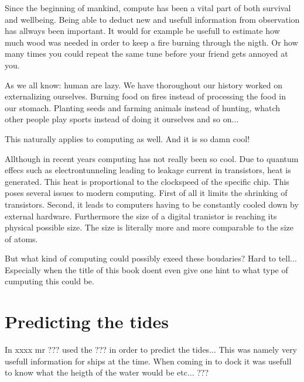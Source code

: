 Since the beginning of mankind, compute has been a vital part of both survival and wellbeing. 
Being able to deduct new and usefull information from observation has allways been important. 
It would for example be usefull to estimate how much wood was needed in order to keep a fire burning through the nigth.
Or how many times you could repeat the same tune before your friend gets annoyed at you.

As we all know: human are lazy. We have thoroughout our history worked on externalizing ourselves. Burning food on fires instead of processing the food in our stomach. Planting seeds and farming animals instead of hunting, whatch other people play sports instead of doing it ourselves and so on... 

This naturally applies to computing as well. And it is so damn cool!

Allthough in recent years computing has not really been so cool. Due to quantum effecs such as electrontunneling leading to leakage current in transistors, heat is generated. This heat is proportional to the clockspeed of the specific chip. This poses several issues to modern computing. First of all it limits the shrinking of transistors. Second, it leads to computers having to be constantly cooled down by external hardware. Furthermore the size of a digital tranistor is reaching its physical possible size. The size is literally more and more comparable to the size of atoms.

But what kind of computing could possibly exeed these boudaries? Hard to tell... Especially when the title of this book doent even give one hint to what type of cumputing this could be.


\section{Predicting the tides}
In xxxx mr ??? used the ??? in order to predict the tides...
This was namely very usefull information for ships at the time. When coming in to dock it was usefull to know what the heigth of the water would be etc... ???